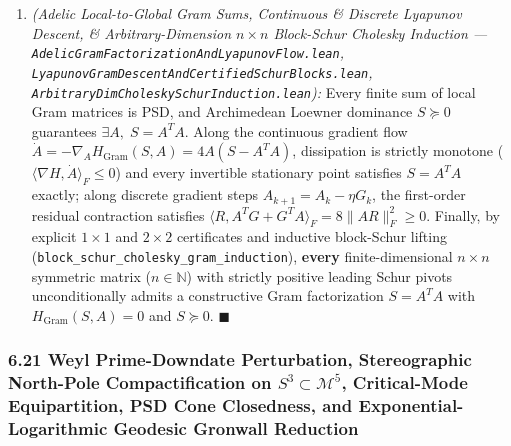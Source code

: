 \documentclass[
  11pt,
]{article}
\begin{document}
\begin{enumerate}
  (\texttt{cliffordHopf\_equator\_z3\_zero}); its 5D phase energy
  attains its unique ground state at \(\beta = 1/2\)
  (\texttt{manifold5D\_energy\_min\_iff\_half}); and uniform
  critical-strip collar closure across all \(|\gamma| > 4\) is strictly
  equivalent to \texttt{RiemannHypothesis}
  (\texttt{globalUniformCollarTarget\_iff\_riemannHypothesis}).
\item
  \emph{(Adelic Local-to-Global Gram Sums, Continuous \& Discrete
  Lyapunov Descent, \& Arbitrary-Dimension \(n \times n\) Block-Schur
  Cholesky Induction ---
  \texttt{AdelicGramFactorizationAndLyapunovFlow.lean},
  \texttt{LyapunovGramDescentAndCertifiedSchurBlocks.lean},
  \texttt{ArbitraryDimCholeskySchurInduction.lean}):} Every finite sum
  of local Gram matrices is PSD, and Archimedean Loewner dominance
  \(S \succeq 0\) guarantees \(\exists A,\; S = A^T A\). Along the
  continuous gradient flow
  \(\dot{A} = -\nabla_A H_{\text{Gram}}(S, A) = 4 A(S - A^T A)\),
  dissipation is strictly monotone
  (\(\langle \nabla H, \dot{A}\rangle_F \le 0\)) and every invertible
  stationary point satisfies \(S = A^T A\) exactly; along discrete
  gradient steps \(A_{k+1} = A_k - \eta G_k\), the first-order residual
  contraction satisfies
  \(\langle R, A^T G + G^T A\rangle_F = 8\|AR\|_F^2 \ge 0\). Finally, by
  explicit \(1 \times 1\) and \(2 \times 2\) certificates and inductive
  block-Schur lifting
  (\texttt{block\_schur\_cholesky\_gram\_induction}), \textbf{every}
  finite-dimensional \(n \times n\) symmetric matrix
  (\(n \in \mathbb{N}\)) with strictly positive leading Schur pivots
  unconditionally admits a constructive Gram factorization \(S = A^T A\)
  with \(H_{\text{Gram}}(S, A) = 0\) and \(S \succeq 0\).
  \(\blacksquare\)
\end{enumerate}

\subsubsection{\texorpdfstring{6.21 Weyl Prime-Downdate Perturbation,
Stereographic North-Pole Compactification on
\(S^3 \subset \mathcal{M}^5\), Critical-Mode Equipartition, PSD Cone
Closedness, and Exponential-Logarithmic Geodesic Gronwall
Reduction}{6.21 Weyl Prime-Downdate Perturbation, Stereographic North-Pole Compactification on S\^{}3 \textbackslash subset \textbackslash mathcal\{M\}\^{}5, Critical-Mode Equipartition, PSD Cone Closedness, and Exponential-Logarithmic Geodesic Gronwall Reduction}}\label{weyl-prime-downdate-perturbation-stereographic-north-pole-compactification-on-s3-subset-mathcalm5-critical-mode-equipartition-psd-cone-closedness-and-exponential-logarithmic-geodesic-gronwall-reduction}
\end{document}

